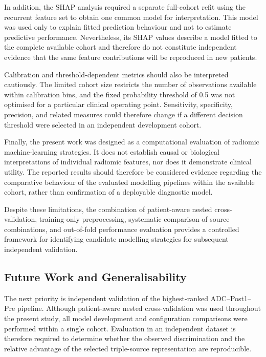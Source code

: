 \documentclass[12pt,twocolumn]{article}
\begin{document}
In addition, the SHAP analysis required a separate full-cohort refit
using the recurrent feature set to obtain one common model for
interpretation. This model was used only to explain fitted prediction
behaviour and not to estimate predictive performance. Nevertheless,
its SHAP values describe a model fitted to the complete available
cohort and therefore do not constitute independent evidence that the
same feature contributions will be reproduced in new patients.

Calibration and threshold-dependent metrics should also be interpreted
cautiously. The limited cohort size restricts the number of
observations available within calibration bins, and the fixed
probability threshold of 0.5 was not optimised for a particular
clinical operating point. Sensitivity, specificity, precision, and
related measures could therefore change if a different decision
threshold were selected in an independent development cohort.

Finally, the present work was designed as a computational evaluation
of radiomic machine-learning strategies. It does not establish causal
or biological interpretations of individual radiomic features, nor
does it demonstrate clinical utility. The reported results should
therefore be considered evidence regarding the comparative behaviour
of the evaluated modelling pipelines within the available cohort,
rather than confirmation of a deployable diagnostic model.

Despite these limitations, the combination of patient-aware nested
cross-validation, training-only preprocessing, systematic comparison
of source combinations, and out-of-fold performance evaluation
provides a controlled framework for identifying candidate modelling
strategies for subsequent independent validation.









\subsection{Future Work and Generalisability}
\label{subsec:discussion_future_work}

The next priority is independent validation of the highest-ranked
ADC--Post1--Pre pipeline. Although patient-aware nested
cross-validation was used throughout the present study, all model
development and configuration comparisons were performed within a
single cohort. Evaluation in an independent dataset is therefore
required to determine whether the observed discrimination and the
relative advantage of the selected triple-source representation are
reproducible.
\end{document}
